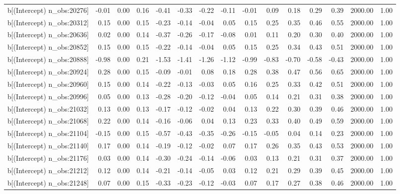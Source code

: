 \begin{table}[ht]
\begin{tabular}{rrrrrrrrrrrrrrr}
  b[(Intercept) n\_obs:20276] & -0.01 & 0.00 & 0.16 & -0.41 & -0.33 & -0.22 & -0.11 & -0.01 & 0.09 & 0.18 & 0.29 & 0.39 & 2000.00 & 1.00 \\ 
  b[(Intercept) n\_obs:20312] & 0.15 & 0.00 & 0.15 & -0.23 & -0.14 & -0.04 & 0.05 & 0.15 & 0.25 & 0.35 & 0.46 & 0.55 & 2000.00 & 1.00 \\ 
  b[(Intercept) n\_obs:20636] & 0.02 & 0.00 & 0.14 & -0.37 & -0.26 & -0.17 & -0.08 & 0.01 & 0.11 & 0.20 & 0.30 & 0.40 & 2000.00 & 1.00 \\ 
  b[(Intercept) n\_obs:20852] & 0.15 & 0.00 & 0.15 & -0.22 & -0.14 & -0.04 & 0.05 & 0.15 & 0.25 & 0.34 & 0.43 & 0.51 & 2000.00 & 1.00 \\ 
  b[(Intercept) n\_obs:20888] & -0.98 & 0.00 & 0.21 & -1.53 & -1.41 & -1.26 & -1.12 & -0.99 & -0.83 & -0.70 & -0.58 & -0.43 & 2000.00 & 1.00 \\ 
  b[(Intercept) n\_obs:20924] & 0.28 & 0.00 & 0.15 & -0.09 & -0.01 & 0.08 & 0.18 & 0.28 & 0.38 & 0.47 & 0.56 & 0.65 & 2000.00 & 1.00 \\ 
  b[(Intercept) n\_obs:20960] & 0.15 & 0.00 & 0.14 & -0.22 & -0.13 & -0.03 & 0.05 & 0.16 & 0.25 & 0.33 & 0.42 & 0.51 & 2000.00 & 1.00 \\ 
  b[(Intercept) n\_obs:20996] & 0.05 & 0.00 & 0.13 & -0.28 & -0.20 & -0.12 & -0.04 & 0.05 & 0.14 & 0.21 & 0.31 & 0.38 & 2000.00 & 1.00 \\ 
  b[(Intercept) n\_obs:21032] & 0.13 & 0.00 & 0.13 & -0.17 & -0.12 & -0.02 & 0.04 & 0.13 & 0.22 & 0.30 & 0.39 & 0.46 & 2000.00 & 1.00 \\ 
  b[(Intercept) n\_obs:21068] & 0.22 & 0.00 & 0.14 & -0.16 & -0.06 & 0.04 & 0.13 & 0.23 & 0.33 & 0.40 & 0.49 & 0.59 & 2000.00 & 1.00 \\ 
  b[(Intercept) n\_obs:21104] & -0.15 & 0.00 & 0.15 & -0.57 & -0.43 & -0.35 & -0.26 & -0.15 & -0.05 & 0.04 & 0.14 & 0.23 & 2000.00 & 1.00 \\ 
  b[(Intercept) n\_obs:21140] & 0.17 & 0.00 & 0.14 & -0.19 & -0.12 & -0.02 & 0.07 & 0.17 & 0.26 & 0.35 & 0.43 & 0.53 & 2000.00 & 1.00 \\ 
  b[(Intercept) n\_obs:21176] & 0.03 & 0.00 & 0.14 & -0.30 & -0.24 & -0.14 & -0.06 & 0.03 & 0.13 & 0.21 & 0.31 & 0.37 & 2000.00 & 1.00 \\ 
  b[(Intercept) n\_obs:21212] & 0.12 & 0.00 & 0.14 & -0.21 & -0.14 & -0.05 & 0.03 & 0.12 & 0.21 & 0.29 & 0.39 & 0.45 & 2000.00 & 1.00 \\ 
  b[(Intercept) n\_obs:21248] & 0.07 & 0.00 & 0.15 & -0.33 & -0.23 & -0.12 & -0.03 & 0.07 & 0.17 & 0.27 & 0.38 & 0.46 & 2000.00 & 1.00 \\ 

\end{tabular}
\end{table}
